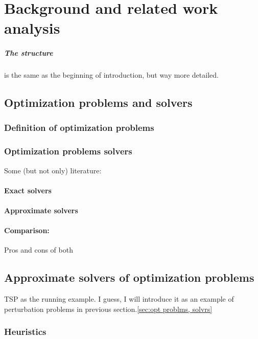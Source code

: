 \chapter{Background and related work analysis}\label{bg}
\paragraph{The structure} is the same as the beginning of introduction, but way more detailed.  


\section{Optimization problems and solvers}\label{bg:opt problems and solvers}

\subsection{Definition of optimization problems}

\subsection{Optimization problems solvers}
Some (but not only) literature: \cite{bergstra2011algorithms}
\subsubsection{Exact solvers}
\subsubsection{Approximate solvers}
\subsubsection{Comparison:} Pros and cons of both \cite{hromkovivc2013algorithmics}


\section{Approximate solvers of optimization problems}
TSP as the running example. I guess, I will introduce it as an example of perturbation problems in previous section.\ref{sec:opt problms, solvrs}

\subsection{Heuristics}

